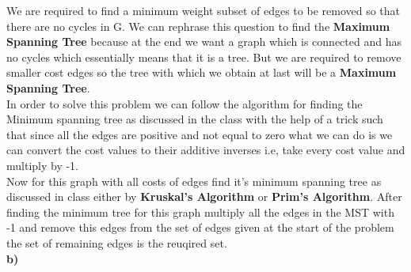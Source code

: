 \documentclass{extarticle}
\theoremstyle{remark}
\newcommand{\tbf}[1]{\textbf{#1}}
\begin{document}
We are required to find a minimum weight subset of edges to be removed so that there are no cycles in G.
We can rephrase this question to find the \tbf{Maximum Spanning Tree} because at the end we want
a graph which is connected and has no cycles which essentially means that it is a tree.
But we are required to remove smaller cost edges so the tree with which we obtain at last 
will be a \tbf{Maximum Spanning Tree}.\\
In order to solve this problem we can follow the algorithm for finding the Minimum spanning tree
as discussed in the class with the help of a trick such that since all the edges are positive
and not equal to zero what we can do is we can convert the cost values to their
additive inverses i.e, take every cost value and multiply by -1.\\
Now for this graph with all costs of edges find it's minimum spanning tree as discussed in 
class either by \tbf{Kruskal's Algorithm} or \tbf{Prim's Algorithm}. After finding the minimum tree for 
this graph multiply all the edges in the MST with -1 and remove this edges from the 
set of edges given at the start of the problem the set of remaining edges is the reuqired set.\\

\tbf{b)}\\
\end{document}

